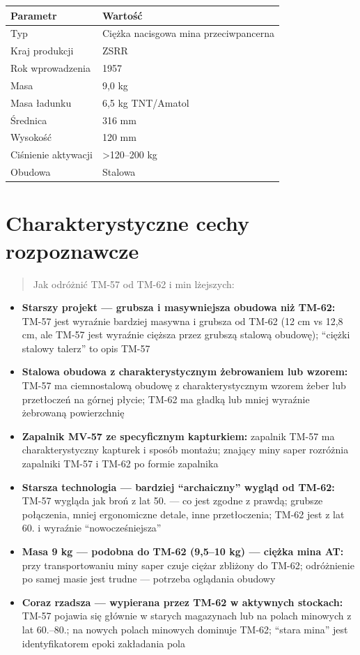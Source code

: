 \documentclass[12pt,openany,oneside]{book}
\providecommand{\tightlist}{%
  \setlength{\itemsep}{0pt}\setlength{\parskip}{0pt}}
\begin{document}
\begin{longtable}[]{@{}ll@{}}
\toprule\noalign{}
Parametr & Wartość \\
\midrule\noalign{}
\endhead
\bottomrule\noalign{}
\endlastfoot
Typ & Ciężka nacisgowa mina przeciwpancerna \\
Kraj produkcji & ZSRR \\
Rok wprowadzenia & 1957 \\
Masa & 9,0 kg \\
Masa ładunku & 6,5 kg TNT/Amatol \\
Średnica & 316 mm \\
Wysokość & 120 mm \\
Ciśnienie aktywacji & \textgreater120--200 kg \\
Obudowa & Stalowa \\
\end{longtable}

\section{Charakterystyczne cechy
rozpoznawcze}\label{charakterystyczne-cechy-rozpoznawcze-114}

\begin{quote}
Jak odróżnić TM-57 od TM-62 i min lżejszych:
\end{quote}

\begin{itemize}
\tightlist
\item
  \textbf{Starszy projekt --- grubsza i masywniejsza obudowa niż TM-62:}
  TM-57 jest wyraźnie bardziej masywna i grubsza od TM-62 (12 cm vs 12,8
  cm, ale TM-57 jest wyraźnie cięższa przez grubszą stalową obudowę);
  ``ciężki stalowy talerz'' to opis TM-57
\item
  \textbf{Stalowa obudowa z charakterystycznym żebrowaniem lub wzorem:}
  TM-57 ma ciemnostalową obudowę z charakterystycznym wzorem żeber lub
  przetłoczeń na górnej płycie; TM-62 ma gładką lub mniej wyraźnie
  żebrowaną powierzchnię
\item
  \textbf{Zapalnik MV-57 ze specyficznym kapturkiem:} zapalnik TM-57 ma
  charakterystyczny kapturek i sposób montażu; znający miny saper
  rozróżnia zapalniki TM-57 i TM-62 po formie zapalnika
\item
  \textbf{Starsza technologia --- bardziej ``archaiczny'' wygląd od
  TM-62:} TM-57 wygląda jak broń z lat 50. --- co jest zgodne z prawdą;
  grubsze połączenia, mniej ergonomiczne detale, inne przetłoczenia;
  TM-62 jest z lat 60. i wyraźnie ``nowocześniejsza''
\item
  \textbf{Masa 9 kg --- podobna do TM-62 (9,5--10 kg) --- ciężka mina
  AT:} przy transportowaniu miny saper czuje ciężar zbliżony do TM-62;
  odróżnienie po samej masie jest trudne --- potrzeba oglądania obudowy
\item
  \textbf{Coraz rzadsza --- wypierana przez TM-62 w aktywnych stockach:}
  TM-57 pojawia się głównie w starych magazynach lub na polach minowych
  z lat 60.--80.; na nowych polach minowych dominuje TM-62; ``stara
  mina'' jest identyfikatorem epoki zakładania pola
\end{itemize}
\end{document}
